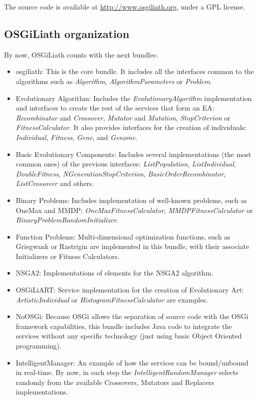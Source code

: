 \documentclass{sig-alternate}
\begin{document}
The source code is available at \url{http://www.osgiliath.org}, under a GPL license.

\subsection{OSGiLiath organization}

By now, OSGiLiath counts with the next bundles:

\begin{itemize}
\item osgiliath: This is the core bundle. It includes all the interfaces common to the algorithms such as {\em Algorithm}, {\em AlgorithmParameters} or {\em Problem}. 
\item Evolutionary Algorithm:  Includes the {\em EvolutionaryAlgorithm} implementation and interfaces to create the rest of the services that form an EA: {\em Recombinator} and {\em Crossover}, {\em Mutator} and {\em Mutation}, {\em StopCriterion} or {\em FitnessCalculator}. It also provides interfaces for the creation of individuals: {\em Individual}, {\em Fitness}, {\em Gene}, and {\em Genome}. 
\item Basic Evolutionary Components: Includes several implementations (the most common ones) of the previous interfaces: {\em ListPopulation}, {\em ListIndividual}, {\em DoubleFitness}, {\em NGenerationStopCriterion}, {\em BasicOrderRecombinator}, {\em ListCrossover} and others.
\item Binary Problems: Includes implementation of well-known problems, such as OneMax and MMDP: {\em OneMaxFitnessCalculator}, {\em MMDPFitnessCalculator} or {\em BinaryProblemRandomInitializer}.
\item Function Problems: Multi-dimensional optimization functions, such as Griegwank or Rastrigin are implemented in this bundle, with their associate Initializers or Fitness Calculators.
\item NSGA2: Implementations of elements for the NSGA2 algorithm.
\item OSGiLiART: Service implementation for the creation of Evolutionary Art: {\em ArtisticIndividual} or {\em HistogramFitnessCalculator} are examples.
\item NoOSGi: Because OSGi allows the separation of source code with the OSGi framework capabilities, this bundle includes Java code to integrate the services without any specific technology (just using basic Object Oriented programming).
\item IntelligentManager: An example of how the services can be bound/unbound in real-time. By now, in each step the {\em IntelligentRandomManager} selects randomly from the available Crossovers, Mutators and Replacers implementations.
\end{itemize}
\end{document}
